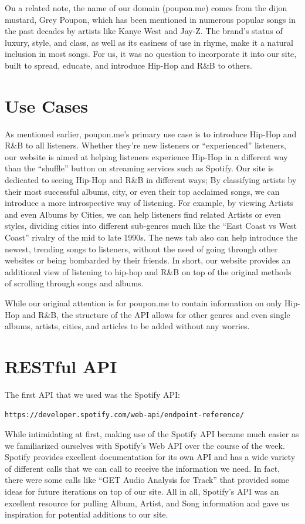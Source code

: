 \documentclass{scrartcl}
\begin{document}
On a related note, the name of our domain (poupon.me) comes from the dijon mustard, Grey Poupon, which has been mentioned in numerous popular songs in the past decades by artists like Kanye West and Jay-Z. The brand’s status of luxury, style, and class, as well as its easiness of use in rhyme, make it a natural inclusion in most songs. For us, it was no question to incorporate it into our site, built to spread, educate, and introduce Hip-Hop and R\&B to others.

\section{Use Cases}
\indent As mentioned earlier, poupon.me’s primary use case is to introduce Hip-Hop and R\&B to all listeners. Whether they’re new listeners or “experienced” listeners, our website is aimed at helping listeners experience Hip-Hop in a different way than the “shuffle” button on streaming services such as Spotify. Our site is dedicated to seeing Hip-Hop and R\&B in different ways; By classifying artists by their most successful albums, city, or even their top acclaimed songs, we can introduce a more introspective way of listening. For example, by viewing Artists and even Albums by Cities, we can help listeners find related Artists or even styles, dividing cities into different sub-genres much like the “East Coast vs West Coast” rivalry of the mid to late 1990s. The news tab also can help introduce the newest, trending songs to listeners, without the need of going through other websites or being bombarded by their friends. In short, our website provides an additional view of listening to hip-hop and R\&B on top of the original methods of scrolling through songs and albums.

While our original attention is for poupon.me to contain information on only Hip-Hop and R\&B, the structure of the API allows for other genres and even single albums, artists, cities, and articles to be added without any worries.

\section{RESTful API}
The first API that we used was the Spotify API: \begin{verbatim}https://developer.spotify.com/web-api/endpoint-reference/\end{verbatim}

While intimidating at first, making use of the Spotify API became much easier as we familiarized ourselves with Spotify’s Web API over the course of the week. Spotify provides excellent documentation for its own API and has a wide variety of different calls that we can call to receive the information we need. In fact, there were some calls like “GET Audio Analysis for Track” that provided some ideas for future iterations on top of our site. All in all, Spotify’s API was an excellent resource for pulling Album, Artist, and Song information and gave us inspiration for potential additions to our site.
\end{document}
